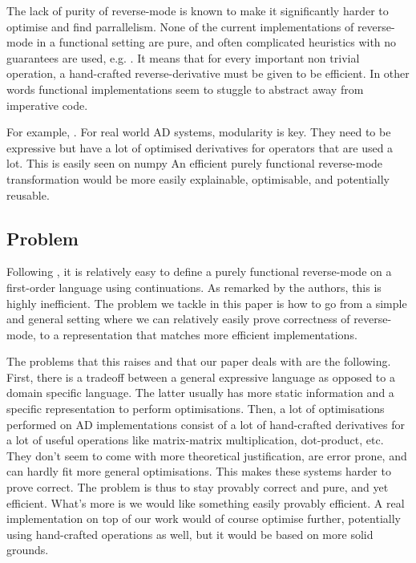 The lack of purity of reverse-mode is known to make it significantly harder to optimise and find parrallelism. 
None of the current implementations of reverse-mode in a functional setting \cite{lantern_icfp,pearlmutter2008reverse,baydin2016diffsharp} are pure, and often complicated heuristics with no guarantees are used, e.g. \cite{xla}.
It means that for every important non trivial operation, a hand-crafted reverse-derivative must be given to be efficient.
In other words functional implementations seem to stuggle to abstract away from imperative code.

For example, .
For real world AD systems, modularity is key. They need to be expressive but have a lot of optimised derivatives for operators that are used a lot.
This is easily seen on numpy 
An efficient purely functional reverse-mode transformation would be more easily explainable, optimisable, and potentially reusable.

\subsection{Problem}

Following \cite{pearlmutter2008reverse}, it is relatively easy to define a purely functional reverse-mode on a first-order language using continuations. 
As remarked by the authors, this is highly inefficient. 
The problem we tackle in this paper is how to go from a simple and general setting where we can relatively easily prove correctness of reverse-mode, 
to a representation that matches more efficient implementations.

The problems that this raises and that our paper deals with are the following. First, there is a tradeoff between a general expressive language 
as opposed to a domain specific language. The latter usually has more static information and a specific representation to perform optimisations.
Then, a lot of optimisations performed on AD implementations consist of a lot of hand-crafted derivatives for a lot of useful operations like matrix-matrix multiplication, dot-product, etc.
They don't seem to come with more theoretical justification, are error prone, and can hardly fit more general optimisations.
This makes these systems harder to prove correct. The problem is thus to stay provably correct and pure, and yet efficient. What's more is we would like something easily provably efficient. 
A real implementation on top of our work would of course optimise further, potentially using hand-crafted operations as well, but it would be based on more solid grounds.

